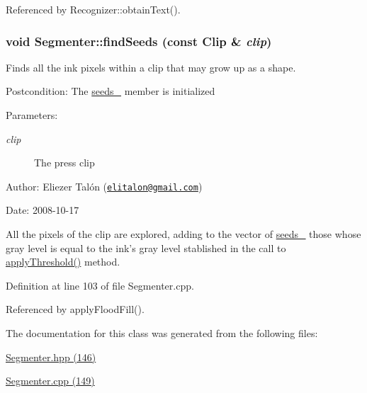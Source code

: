 Referenced by Recognizer::obtainText().\hypertarget{class_segmenter_bacab187b543a51c5322c01fc0a29ffb}{
\subsubsection[findSeeds]{\setlength{\rightskip}{0pt plus 5cm}void Segmenter::findSeeds (const {\bf Clip} \& {\em clip})}}
\label{class_segmenter_bacab187b543a51c5322c01fc0a29ffb}


Finds all the ink pixels within a clip that may grow up as a shape. 

\begin{Desc}
\item[Postcondition:]The \hyperlink{class_segmenter_32db9acb9fe721613eb98c7bb8d2a8f0}{seeds\_\-} member is initialized\end{Desc}
\begin{Desc}
\item[Parameters:]
\begin{description}
\item[{\em clip}]The press clip\end{description}
\end{Desc}
\begin{Desc}
\item[Author:]Eliezer Talón (\href{mailto:elitalon@gmail.com}{\tt elitalon@gmail.com}) \end{Desc}
\begin{Desc}
\item[Date:]2008-10-17\end{Desc}
All the pixels of the clip are explored, adding to the vector of \hyperlink{class_segmenter_32db9acb9fe721613eb98c7bb8d2a8f0}{seeds\_\-} those whose gray level is equal to the ink's gray level stablished in the call to \hyperlink{class_segmenter_6854315e3320f9d9a8ece14cbb8570ee}{applyThreshold()} method. 

Definition at line 103 of file Segmenter.cpp.

Referenced by applyFloodFill().

The documentation for this class was generated from the following files:\begin{CompactItemize}
\item 
\hyperlink{_segmenter_8hpp}{Segmenter.hpp (146)}\item 
\hyperlink{_segmenter_8cpp}{Segmenter.cpp (149)}\end{CompactItemize}
